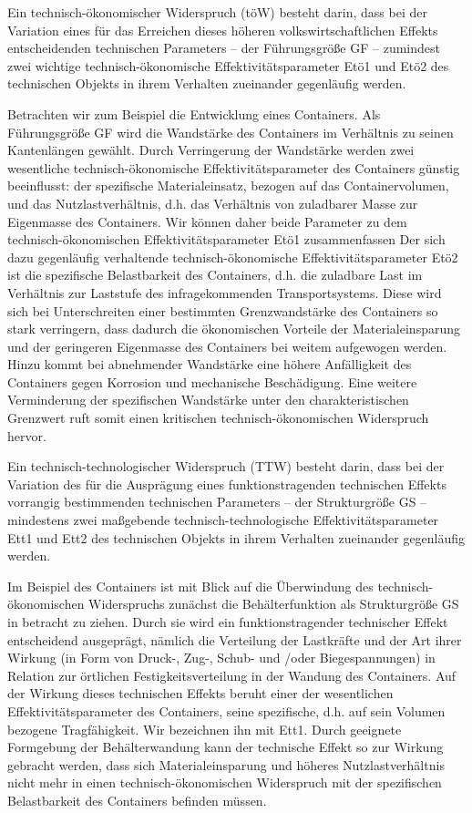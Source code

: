 \documentclass[12pt,a4paper]{article}
\begin{document}
Ein technisch-ökonomischer Widerspruch (töW) besteht darin, dass bei der Variation eines für das Erreichen dieses höheren volkswirtschaftlichen Effekts entscheidenden technischen Parameters – der Führungsgröße GF – zumindest zwei wichtige technisch-ökonomische Effektivitätsparameter Etö1 und Etö2 des technischen Objekts in ihrem Verhalten zueinander gegenläufig werden.

Betrachten wir zum Beispiel die Entwicklung eines Containers. Als Führungsgröße GF wird die Wandstärke des Containers im Verhältnis zu seinen Kantenlängen gewählt. Durch Verringerung der Wandstärke werden zwei wesentliche technisch-ökonomische Effektivitätsparameter des Containers günstig beeinflusst: der spezifische Materialeinsatz, bezogen auf das Containervolumen, und das Nutzlastverhältnis, d.h. das Verhältnis von zuladbarer Masse zur Eigenmasse des Containers. Wir können daher beide Parameter zu dem technisch-ökonomischen Effektivitätsparameter Etö1 zusammenfassen Der sich dazu gegenläufig verhaltende technisch-ökonomische Effektivitätsparameter Etö2 ist die spezifische Belastbarkeit des Containers, d.h. die zuladbare Last im Verhältnis zur Laststufe des infragekommenden Transportsystems. Diese wird sich bei Unterschreiten einer bestimmten Grenzwandstärke des Containers so stark verringern, dass dadurch die ökonomischen Vorteile der Materialeinsparung und der geringeren Eigenmasse des Containers bei weitem aufgewogen werden. Hinzu kommt bei abnehmender Wandstärke eine höhere Anfälligkeit des Containers gegen Korrosion und mechanische Beschädigung. Eine weitere Verminderung der spezifischen Wandstärke unter den charakteristischen Grenzwert ruft somit einen kritischen technisch-ökonomischen Widerspruch hervor.

Ein technisch-technologischer Widerspruch (TTW) besteht darin, dass bei der Variation des für die Ausprägung eines funktionstragenden technischen Effekts vorrangig bestimmenden technischen Parameters – der Strukturgröße GS – mindestens zwei maßgebende technisch-technologische Effektivitätsparameter Ett1 und Ett2 des technischen Objekts in ihrem Verhalten zueinander gegenläufig werden.

Im Beispiel des Containers ist mit Blick auf die Überwindung des technisch-ökonomischen Widerspruchs zunächst die Behälterfunktion als Strukturgröße GS in betracht zu ziehen. Durch sie wird ein funktionstragender technischer Effekt entscheidend ausgeprägt, nämlich die Verteilung der Lastkräfte und der Art ihrer Wirkung (in Form von Druck-, Zug-, Schub- und /oder Biegespannungen) in Relation zur örtlichen Festigkeitsverteilung in der Wandung des Containers. Auf der Wirkung dieses technischen Effekts beruht einer der wesentlichen Effektivitätsparameter des Containers, seine spezifische, d.h. auf sein Volumen bezogene Tragfähigkeit. Wir bezeichnen ihn mit Ett1. Durch geeignete Formgebung der Behälterwandung kann der technische Effekt so zur Wirkung gebracht werden, dass sich Materialeinsparung und höheres Nutzlastverhältnis nicht mehr in einen technisch-ökonomischen Widerspruch mit der spezifischen Belastbarkeit des Containers befinden müssen.
\end{document}
